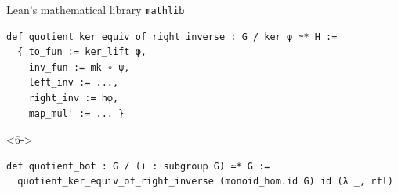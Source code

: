 \documentclass[10pt]{beamer}
\begin{document}
\begin{frame}[fragile, t]{Lean's mathematical library \texttt{mathlib}}
\begin{onlyenv}
\begin{lstlisting}[basicstyle=\scriptsize, frame=single]
def quotient_ker_equiv_of_right_inverse : G / ker φ ≃* H :=
  { to_fun := ker_lift φ,
    inv_fun := mk ∘ ψ,
    left_inv := ...,
    right_inv := hφ,
    map_mul' := ... }
\end{lstlisting}
\end{onlyenv}



\begin{onlyenv}<6->
\begin{lstlisting}[basicstyle=\scriptsize, frame=single]
def quotient_bot : G / (⊥ : subgroup G) ≃* G :=
  quotient_ker_equiv_of_right_inverse (monoid_hom.id G) id (λ _, rfl)
\end{lstlisting}
\end{onlyenv}



\end{frame}
\end{document}
